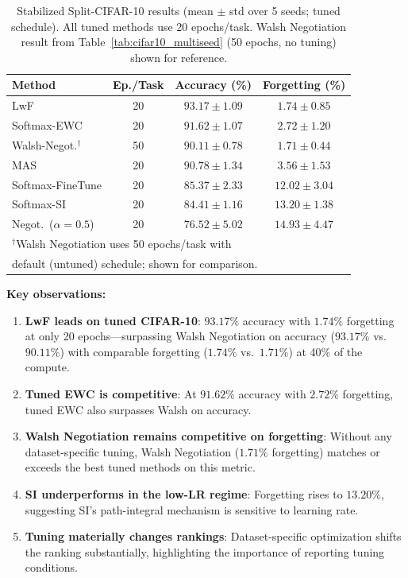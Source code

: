 \documentclass[preprint,review,12pt]{elsarticle}
\begin{document}
\begin{table}[t]
\centering
\caption{Stabilized Split-CIFAR-10 results (mean $\pm$ std over 5 seeds; tuned schedule). All tuned methods use 20 epochs/task. Walsh Negotiation result from Table~\ref{tab:cifar10_multiseed} (50 epochs, no tuning) shown for reference.}
\label{tab:cifar10_stable}
\begin{tabular}{lccc}
\toprule
Method & Ep./Task & Accuracy (\%) & Forgetting (\%) \\
\midrule
LwF & 20 & $\mathbf{93.17 \pm 1.09}$ & $1.74 \pm 0.85$ \\
Softmax-EWC & 20 & $91.62 \pm 1.07$ & $2.72 \pm 1.20$ \\
Walsh-Negot.$^\dagger$ & 50 & $90.11 \pm 0.78$ & $\mathbf{1.71 \pm 0.44}$ \\
MAS & 20 & $90.78 \pm 1.34$ & $3.56 \pm 1.53$ \\
Softmax-FineTune & 20 & $85.37 \pm 2.33$ & $12.02 \pm 3.04$ \\
Softmax-SI & 20 & $84.41 \pm 1.16$ & $13.20 \pm 1.38$ \\
Negot.\ ($\alpha\!=\!0.5$) & 20 & $76.52 \pm 5.02$ & $14.93 \pm 4.47$ \\
\bottomrule
\multicolumn{4}{l}{\scriptsize $^\dagger$Walsh Negotiation uses 50 epochs/task with} \\
\multicolumn{4}{l}{\scriptsize default (untuned) schedule; shown for comparison.}
\end{tabular}
\end{table}

\textbf{Key observations:}
\begin{enumerate}
\item \textbf{LwF leads on tuned CIFAR-10}: $93.17\%$ accuracy with $1.74\%$ forgetting at only 20 epochs---surpassing Walsh Negotiation on accuracy ($93.17\%$ vs.\ $90.11\%$) with comparable forgetting ($1.74\%$ vs.\ $1.71\%$) at 40\% of the compute.
\item \textbf{Tuned EWC is competitive}: At $91.62\%$ accuracy with $2.72\%$ forgetting, tuned EWC also surpasses Walsh on accuracy.
\item \textbf{Walsh Negotiation remains competitive on forgetting}: Without any dataset-specific tuning, Walsh Negotiation ($1.71\%$ forgetting) matches or exceeds the best tuned methods on this metric.
\item \textbf{SI underperforms in the low-LR regime}: Forgetting rises to $13.20\%$, suggesting SI's path-integral mechanism is sensitive to learning rate.
\item \textbf{Tuning materially changes rankings}: Dataset-specific optimization shifts the ranking substantially, highlighting the importance of reporting tuning conditions.
\end{enumerate}
\end{document}
